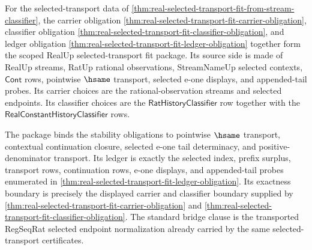 \begin{theorem}
\label{thm:real-selected-transport-fit-scoped-boundary-package}
For the selected-transport data of
\autoref{thm:real-selected-transport-fit-from-stream-classifier}, the carrier
obligation
\autoref{thm:real-selected-transport-fit-carrier-obligation}, classifier
obligation
\autoref{thm:real-selected-transport-fit-classifier-obligation}, and ledger
obligation
\autoref{thm:real-selected-transport-fit-ledger-obligation} together form the
scoped RealUp selected-transport fit package. Its source side is made of RealUp
streams, RatUp rational observations, StreamNameUp selected contexts,
$\mathsf{Cont}$ rows, pointwise $\hsame$ transport, selected e-one displays,
and appended-tail probes. Its carrier choices are the rational-observation
streams and selected endpoints. Its classifier choices are the
$\mathsf{RatHistoryClassifier}$ row together with the
$\mathsf{RealConstantHistoryClassifier}$ rows.

The package binds the stability obligations to pointwise $\hsame$ transport,
contextual continuation closure, selected e-one tail determinacy, and
positive-denominator transport. Its ledger is exactly the selected index,
prefix surplus, transport rows, continuation rows, e-one displays, and
appended-tail probes enumerated in
\autoref{thm:real-selected-transport-fit-ledger-obligation}. Its exactness
boundary is precisely the displayed carrier and classifier boundary supplied by
\autoref{thm:real-selected-transport-fit-carrier-obligation} and
\autoref{thm:real-selected-transport-fit-classifier-obligation}. The standard
bridge clause is the transported RegSeqRat selected endpoint normalization
already carried by the same selected-transport certificates.
\end{theorem}
